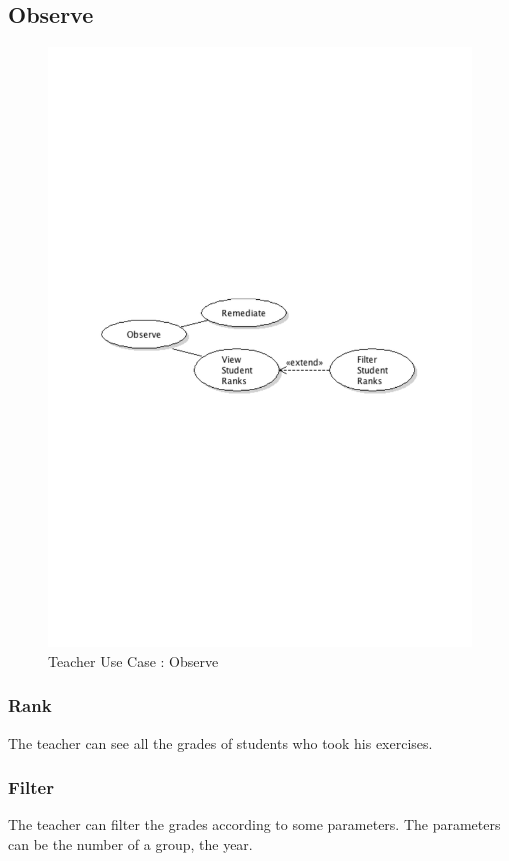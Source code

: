 	\subsection{Observe}
		\begin{figure}[ht]
			\begin{center}
				\includegraphics[width=\textwidth,  trim=2cm 12cm 2cm 12cm]{UML_figure/UC/teacher/UC_Teacher_Observe.pdf}
				\caption{Teacher Use Case : Observe}
			\end{center}
		\end{figure}
		\subsubsection{Rank}
			The teacher can see all the grades of students who took his exercises.
		\subsubsection{Filter}
			The teacher can filter the grades according to some parameters.
			The parameters can be the number of a group, the year.
